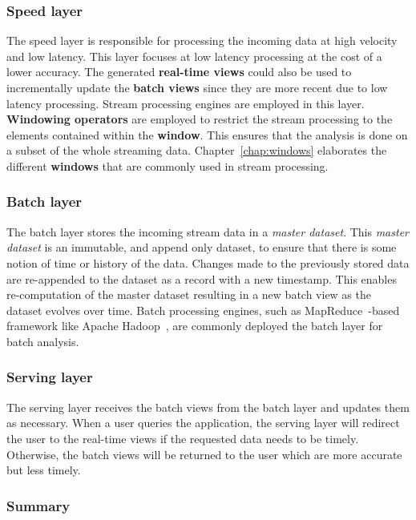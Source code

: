 \subsubsection{Speed layer}%
\label{sssec:Speed layer}
The speed layer is responsible for processing the incoming data at high velocity and low latency. 
This layer focuses at low latency processing at the cost of a lower accuracy. The generated 
\textbf{real-time views}  could also be used to incrementally update the \textbf{batch views} since they 
are more recent due to low latency processing. Stream processing engines are employed in this 
layer.  \textbf{Windowing operators} are employed 
to restrict the stream processing to the elements contained within the \textbf{window}. 
This ensures that the analysis is done on a subset of the whole streaming data. 
Chapter~\ref{chap:windows} elaborates the different \textbf{windows} that 
are commonly used in stream processing. 

\subsubsection{Batch layer}%
\label{sssec:Batch layer}
The batch layer stores the incoming stream data in a \emph{master dataset}. This \emph{master dataset} is an immutable,
and append only dataset, to ensure that there is some notion of time or history of the data. Changes made to 
the previously stored data are re-appended to the dataset as a record with a new timestamp.  
This enables re-computation of the master dataset resulting in a new batch view as the dataset evolves over time. 
Batch processing engines, such as MapReduce~\cite{mapreduce}-based framework like Apache Hadoop~\cite{hadoop}, 
are commonly deployed the batch layer for batch analysis. 


\subsubsection{Serving layer}%
\label{sssec:Serving layer}

The serving layer receives the batch views from the batch layer and updates them as necessary. When a user 
queries the application, the serving layer will redirect the user to the real-time views if the 
requested data needs to be timely. Otherwise, the batch views will be returned to the user which are 
more accurate but less timely.  


\subsubsection{Summary}%
\label{ssub:Summary}

